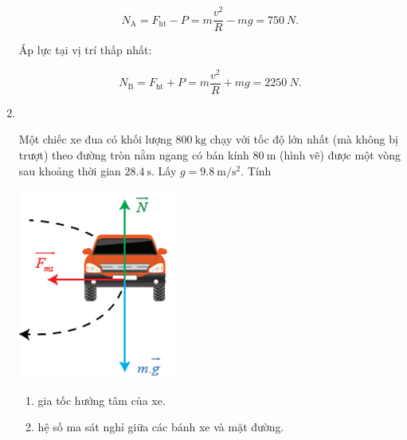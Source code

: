 \begin{enumerate}[label=\bfseries Câu \arabic*:]
{	$$N_\text{A} = F_\text{ht} - P = m \dfrac{v^2}{R} - mg =\SI{750}{N}.$$
	
	Áp lực tại vị trí thấp nhất:
	
	$$N_\text{B} = F_\text{ht} + P = m \dfrac{v^2}{R} + mg =\SI{2250}{N}.$$
	
}

\item {}\\
{Một chiếc xe đua có khối lượng $\SI{800}{\kilogram}$ chạy với tốc độ lớn nhất (mà không bị trượt) theo đường tròn nằm ngang có bán kính $\SI{80}{\meter}$ (hình vẽ) được một vòng sau khoảng thời gian $\SI{28.4}{\second}$. Lấy $g=\SI{9.8}{\meter/\second^2}$. Tính
	\begin{center}
		\includegraphics[width=0.25\linewidth]{../figs/VN10-2023-PH-TP032-P-1}
	\end{center}
\begin{enumerate}[label=\alph*)]
	\item gia tốc hướng tâm của xe.
	\item hệ số ma sát nghỉ giữa các bánh xe và mặt đường.
\end{enumerate}
}


\end{enumerate}
